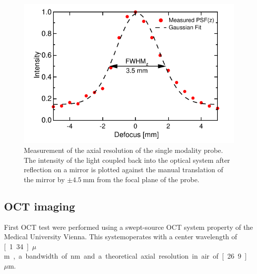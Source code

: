\documentclass[10pt]{iopart}
\begin{document}
\begin{figure}[h!]\centering \includegraphics[width=\columnwidth]{figures/PSFz.pdf}
      \caption{Measurement of the axial resolution of the single modality probe. The intensity of the light coupled back into the optical system after reflection on a mirror is plotted against the manual translation of the mirror by $\pm \SI{4.5}{\milli\meter}$ from the focal plane of the probe. }
      \label{fig:FWHM}
\end{figure}




\subsection{OCT imaging}

First OCT test were performed using a swept-source OCT system property of the Medical University Vienna. This systemoperates with a center wavelength of \unit[1.34]{$\mu$m}, a bandwidth of \unit[37]{nm} and a theoretical axial resolution in air of \unit[26.9]{$\mu$m}.
\end{document}
